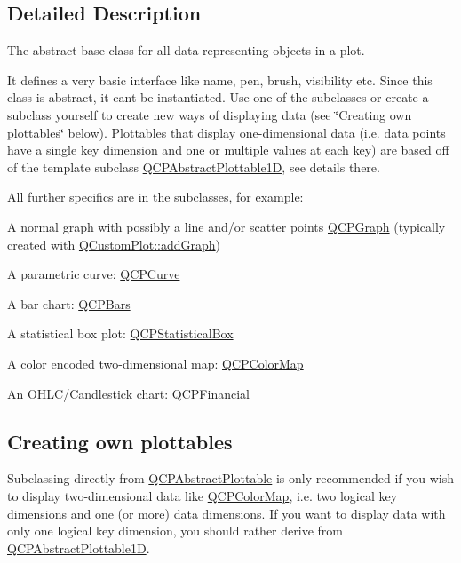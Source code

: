 \subsection{Detailed Description}
The abstract base class for all data representing objects in a plot. 

It defines a very basic interface like name, pen, brush, visibility etc. Since this class is abstract, it can\textquotesingle{}t be instantiated. Use one of the subclasses or create a subclass yourself to create new ways of displaying data (see \char`\"{}\+Creating own plottables\char`\"{} below). Plottables that display one-\/dimensional data (i.\+e. data points have a single key dimension and one or multiple values at each key) are based off of the template subclass \mbox{\hyperlink{class_q_c_p_abstract_plottable1_d}{Q\+C\+P\+Abstract\+Plottable1D}}, see details there.

All further specifics are in the subclasses, for example\+: \begin{DoxyItemize}
\item A normal graph with possibly a line and/or scatter points \mbox{\hyperlink{class_q_c_p_graph}{Q\+C\+P\+Graph}} (typically created with \mbox{\hyperlink{class_q_custom_plot_a6fb2873d35a8a8089842d81a70a54167}{Q\+Custom\+Plot\+::add\+Graph}}) \item A parametric curve\+: \mbox{\hyperlink{class_q_c_p_curve}{Q\+C\+P\+Curve}} \item A bar chart\+: \mbox{\hyperlink{class_q_c_p_bars}{Q\+C\+P\+Bars}} \item A statistical box plot\+: \mbox{\hyperlink{class_q_c_p_statistical_box}{Q\+C\+P\+Statistical\+Box}} \item A color encoded two-\/dimensional map\+: \mbox{\hyperlink{class_q_c_p_color_map}{Q\+C\+P\+Color\+Map}} \item An O\+H\+L\+C/\+Candlestick chart\+: \mbox{\hyperlink{class_q_c_p_financial}{Q\+C\+P\+Financial}}\end{DoxyItemize}
\hypertarget{class_q_c_p_abstract_plottable_plottables-subclassing}{}\subsection{Creating own plottables}\label{class_q_c_p_abstract_plottable_plottables-subclassing}
Subclassing directly from \mbox{\hyperlink{class_q_c_p_abstract_plottable}{Q\+C\+P\+Abstract\+Plottable}} is only recommended if you wish to display two-\/dimensional data like \mbox{\hyperlink{class_q_c_p_color_map}{Q\+C\+P\+Color\+Map}}, i.\+e. two logical key dimensions and one (or more) data dimensions. If you want to display data with only one logical key dimension, you should rather derive from \mbox{\hyperlink{class_q_c_p_abstract_plottable1_d}{Q\+C\+P\+Abstract\+Plottable1D}}.


